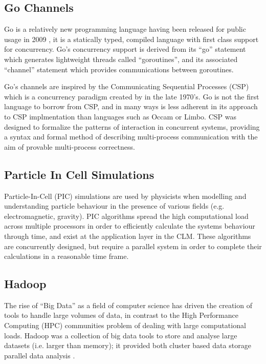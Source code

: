 \documentclass{sig-alternate}
\begin{document}
\subsection{Go Channels}
Go is a relatively new programming language having been released for public usage in 2009 \cite{go:_frequen_asked_quest}, it is a statically typed, compiled language with first class support for concurrency. Go's concurrency support is derived from its ``go'' statement which generates lightweight threads called ``goroutines'', and its associated ``channel'' statement which provides communications between goroutines.

Go's channels are inspired by the Communicating Sequential Processes (CSP) which is a concurrency paradigm created by \cite{Hoare:1978:CSP:359576.359585} in the late 1970's. Go is not the first language to borrow from CSP, and in many ways is less adherent in its approach to CSP implmentation than languages such as Occam or Limbo. CSP was designed to formalize the patterns of interaction in concurrent systems, providing a syntax and formal method of describing multi-process communication with the aim of provable multi-process correctness.

\subsection{Particle In Cell Simulations}
Particle-In-Cell (PIC) simulations are used by physicists when modelling and understanding particle behaviour in the presence of various fields (e.g. electromagnetic, gravity). PIC algorithms spread the high computational load across multiple processors in order to efficiently calculate the systems behaviour through time, and exist at the application layer in the CLM. These algorithms are concurrently designed, but require a parallel system in order to complete their calculations in a reasonable time frame. 

\subsection{Hadoop}
The rise of ``Big Data'' as a field of computer science \cite{IBM:2011:UBD:2132803} \cite{james11:_big} has driven the creation of tools to handle large volumes of data, in contrast to the High Performance Computing (HPC) communities problem of dealing with large computational loads. Hadoop was a collection of big data tools to store and analyse large datasets (i.e. larger than memory); it provided both cluster based data storage parallel data analysis \cite{Dean:2008:MSD:1327452.1327492}. 
\end{document}
